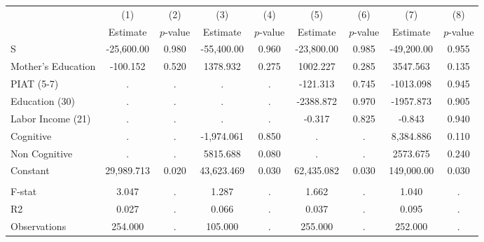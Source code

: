 \begin{tabular}{lcccccccc} \toprule
 & (1) & (2) & (3) & (4) & (5) & (6) & (7) & (8) \\ 
 & Estimate  & $p$-value  & Estimate  & $p$-value  & Estimate  & $p$-value  & Estimate  & $p$-value  \\  \midrule
S & -25,600.00 &     0.980 & -55,400.00 &     0.960 & -23,800.00 &     0.985 & -49,200.00 &     0.955 \\  
Mother's Education &  -100.152 &     0.520 &  1378.932 &     0.275 &  1002.227 &     0.285 &  3547.563 &     0.135 \\  
PIAT (5-7) &         . &         . &         . &         . &  -121.313 &     0.745 & -1013.098 &     0.945 \\  
Education (30) &         . &         . &         . &         . & -2388.872 &     0.970 & -1957.873 &     0.905 \\  
Labor Income (21) &         . &         . &         . &         . &    -0.317 &     0.825 &    -0.843 &     0.940 \\  
Cognitive &         . &         . & -1,974.061 &     0.850 &         . &         . &  8,384.886 &     0.110 \\  
Non Cognitive &         . &         . &  5815.688 &     0.080 &         . &         . &  2573.675 &     0.240 \\  
Constant & 29,989.713 &     0.020 & 43,623.469 &     0.030 & 62,435.082 &     0.030 &  149,000.00 &     0.030 \\  \\ \midrule
F-stat &     3.047 &         . &     1.287 &         . &     1.662 &         . &     1.040 &         . \\  
R2 &     0.027 &         . &     0.066 &         . &     0.037 &         . &     0.095 &         . \\  
Observations &   254.000 &         . &   105.000 &         . &   255.000 &         . &   252.000 &         . \\  
\bottomrule \end{tabular}
